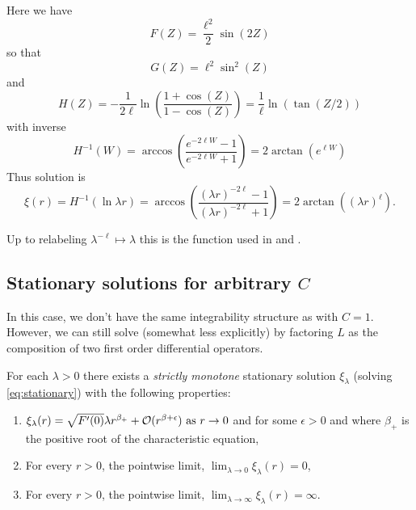 \documentclass{amsart}
\begin{document}
\begin{example}

Here we have
\[
F(Z) = \frac{\ell^2}{2} \sin(2Z)
\]
so that
\[
G(Z) = \ell^2 \sin^2(Z)
\]
and
\[
H(Z) = -\frac{1}{2\ell} \ln \left(\frac{1+\cos(Z)}{1-\cos(Z)}\right) = \frac{1}{\ell}\ln \left(\tan(Z/2)\right)
\]
with inverse
\[
H^{-1}(W) = \arccos\left(\frac{e^{-2\ell W} - 1}{e^{-2\ell W} + 1}\right) = 2 \arctan(e^{\ell W})
\]
Thus solution is
\[
\xi(r) = H^{-1} (\ln \lambda r) = \arccos\left(\frac{(\lambda r)^{-2\ell} - 1}{(\lambda r)^{-2\ell} + 1}\right) = 2\arctan((\lambda r)^{\ell}).
\]

Up to relabeling \(\lambda^{-\ell} \mapsto \lambda\) this is the function used in \cite{MR1180392} and \cite{MR2332425}.
\end{example}

\subsection{Stationary solutions for arbitrary \(C\)}

In this case, we don't have the same integrability structure as with \(C = 1\). However, we can still solve (somewhat less explicitly) by factoring \(L\) as the composition of two first order differential operators.

\begin{lemma}
\label{lem:stationaryC}
For each \(\lambda > 0 \) there exists a \emph{strictly monotone} stationary solution \(\xi_{\lambda}\) (solving \eqref{eq:stationary}) with the following properties:
\begin{enumerate}
\item \(\xi_{\lambda} (r) = \sqrt{F'(0)} \lambda r^{\beta_+} + \operatorname{\mathcal{O}}(r^{\beta + \epsilon}) \text{ as } r \to 0\) and for some \(\epsilon > 0\) and where \(\beta_+\) is the positive root of the characteristic equation, \label{itm:stationaryC_asymptotic}
\item For every \(r > 0\), the pointwise limit, \(\lim_{\lambda \to 0} \xi_{\lambda} (r) = 0\), \label{itm:stationaryC_lambda_0}
\item For every \(r > 0\), the pointwise limit, \(\lim_{\lambda \to \infty} \xi_{\lambda} (r) = \infty\). \label{itm:stationaryC_lambda_infty}
\end{enumerate}
\end{lemma}
\end{document}
